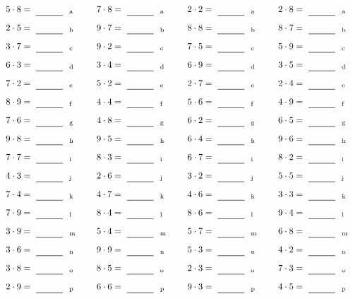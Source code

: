 \documentclass
[
  draft    = true,
  fontsize = 11pt,
  parskip  = half-
]
{scrartcl}
\begin{document}
\par\vfill\par
\begin{align*}
    \pline{5\cdot8}&=\rline{a}
  & \pline{7\cdot8}&=\rline{a}
  & \pline{2\cdot2}&=\rline{a}
  & \pline{2\cdot8}&=\rline{a} \\[1ex]
    \pline{2\cdot5}&=\rline{b}
  & \pline{9\cdot7}&=\rline{b}
  & \pline{8\cdot8}&=\rline{b}
  & \pline{8\cdot7}&=\rline{b} \\[1ex]
    \pline{3\cdot7}&=\rline{c}
  & \pline{9\cdot2}&=\rline{c}
  & \pline{7\cdot5}&=\rline{c}
  & \pline{5\cdot9}&=\rline{c} \\[1ex]
    \pline{6\cdot3}&=\rline{d}
  & \pline{3\cdot4}&=\rline{d}
  & \pline{6\cdot9}&=\rline{d}
  & \pline{3\cdot5}&=\rline{d} \\[1ex]
    \pline{7\cdot2}&=\rline{e}
  & \pline{5\cdot2}&=\rline{e}
  & \pline{2\cdot7}&=\rline{e}
  & \pline{2\cdot4}&=\rline{e} \\[1ex]
    \pline{8\cdot9}&=\rline{f}
  & \pline{4\cdot4}&=\rline{f}
  & \pline{5\cdot6}&=\rline{f}
  & \pline{4\cdot9}&=\rline{f} \\[1ex]
    \pline{7\cdot6}&=\rline{g}
  & \pline{4\cdot8}&=\rline{g}
  & \pline{6\cdot2}&=\rline{g}
  & \pline{6\cdot5}&=\rline{g} \\[1ex]
    \pline{9\cdot8}&=\rline{h}
  & \pline{9\cdot5}&=\rline{h}
  & \pline{6\cdot4}&=\rline{h}
  & \pline{9\cdot6}&=\rline{h} \\[1ex]
    \pline{7\cdot7}&=\rline{i}
  & \pline{8\cdot3}&=\rline{i}
  & \pline{6\cdot7}&=\rline{i}
  & \pline{8\cdot2}&=\rline{i} \\[1ex]
    \pline{4\cdot3}&=\rline{j}
  & \pline{2\cdot6}&=\rline{j}
  & \pline{3\cdot2}&=\rline{j}
  & \pline{5\cdot5}&=\rline{j} \\[1ex]
    \pline{7\cdot4}&=\rline{k}
  & \pline{4\cdot7}&=\rline{k}
  & \pline{4\cdot6}&=\rline{k}
  & \pline{3\cdot3}&=\rline{k} \\[1ex]
    \pline{7\cdot9}&=\rline{l}
  & \pline{8\cdot4}&=\rline{l}
  & \pline{8\cdot6}&=\rline{l}
  & \pline{9\cdot4}&=\rline{l} \\[1ex]
    \pline{3\cdot9}&=\rline{m}
  & \pline{5\cdot4}&=\rline{m}
  & \pline{5\cdot7}&=\rline{m}
  & \pline{6\cdot8}&=\rline{m} \\[1ex]
    \pline{3\cdot6}&=\rline{n}
  & \pline{9\cdot9}&=\rline{n}
  & \pline{5\cdot3}&=\rline{n}
  & \pline{4\cdot2}&=\rline{n} \\[1ex]
    \pline{3\cdot8}&=\rline{o}
  & \pline{8\cdot5}&=\rline{o}
  & \pline{2\cdot3}&=\rline{o}
  & \pline{7\cdot3}&=\rline{o} \\[1ex]
    \pline{2\cdot9}&=\rline{p}
  & \pline{6\cdot6}&=\rline{p}
  & \pline{9\cdot3}&=\rline{p}
  & \pline{4\cdot5}&=\rline{p}
\end{align*}
\end{document}
